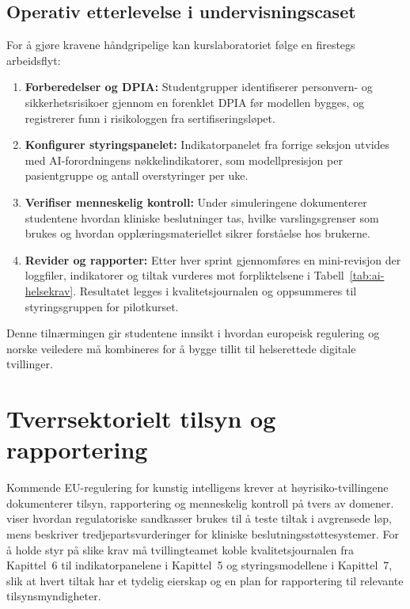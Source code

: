 \subsection{Operativ etterlevelse i undervisningscaset}
For å gjøre kravene håndgripelige kan kurslaboratoriet følge en firestegs arbeidsflyt:
\begin{enumerate}
    \item \textbf{Forberedelser og DPIA:} Studentgrupper identifiserer personvern- og sikkerhetsrisikoer gjennom en forenklet DPIA før modellen bygges, og registrerer funn i risikologgen fra sertifiseringsløpet.\citep{datatilsynet2023dpia}
    \item \textbf{Konfigurer styringspanelet:} Indikatorpanelet fra forrige seksjon utvides med AI-forordningens nøkkelindikatorer, som modellpresisjon per pasientgruppe og antall overstyringer per uke.
    \item \textbf{Verifiser menneskelig kontroll:} Under simuleringene dokumenterer studentene hvordan kliniske beslutninger tas, hvilke varslingsgrenser som brukes og hvordan opplæringsmateriellet sikrer forståelse hos brukerne.
    \item \textbf{Revider og rapporter:} Etter hver sprint gjennomføres en mini-revisjon der loggfiler, indikatorer og tiltak vurderes mot forpliktelsene i Tabell~\ref{tab:ai-helsekrav}. Resultatet legges i kvalitetsjournalen og oppsummeres til styringsgruppen for pilotkurset.
\end{enumerate}

Denne tilnærmingen gir studentene innsikt i hvordan europeisk regulering og norske veiledere må kombineres for å bygge tillit til helserettede digitale tvillinger.

\section{Tverrsektorielt tilsyn og rapportering}
Kommende EU-regulering for kunstig intelligens krever at høyrisiko-tvillingene dokumenterer tilsyn, rapportering og menneskelig kontroll på tvers av domener. \citet{datatilsynet2023sandkasse} viser hvordan regulatoriske sandkasser brukes til å teste tiltak i avgrensede løp, mens \citet{ehelse2024tilsyn} beskriver tredjepartsvurderinger for kliniske beslutningsstøttesystemer. For å holde styr på slike krav må tvillingteamet koble kvalitetsjournalen fra Kapittel~6 til indikatorpanelene i Kapittel~5 og styringsmodellene i Kapittel~7, slik at hvert tiltak har et tydelig eierskap og en plan for rapportering til relevante tilsynsmyndigheter.

